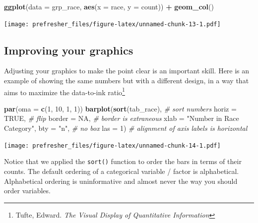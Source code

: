 \documentclass[]{book}
\newenvironment{Shaded}{\begin{snugshade}}{\end{snugshade}}
\newcommand{\KeywordTok}[1]{\textcolor[rgb]{0.13,0.29,0.53}{\textbf{#1}}}
\newcommand{\DataTypeTok}[1]{\textcolor[rgb]{0.13,0.29,0.53}{#1}}
\newcommand{\DecValTok}[1]{\textcolor[rgb]{0.00,0.00,0.81}{#1}}
\newcommand{\StringTok}[1]{\textcolor[rgb]{0.31,0.60,0.02}{#1}}
\newcommand{\CommentTok}[1]{\textcolor[rgb]{0.56,0.35,0.01}{\textit{#1}}}
\newcommand{\OtherTok}[1]{\textcolor[rgb]{0.56,0.35,0.01}{#1}}
\newcommand{\OperatorTok}[1]{\textcolor[rgb]{0.81,0.36,0.00}{\textbf{#1}}}
\newcommand{\NormalTok}[1]{#1}
\let\rmarkdownfootnote\footnote%
\def\footnote{\protect\rmarkdownfootnote}
\theoremstyle{definition}
\theoremstyle{definition}
\theoremstyle{definition}
\theoremstyle{remark}
\begin{document}
\begin{Shaded}
\begin{Highlighting}[]
\KeywordTok{ggplot}\NormalTok{(}\DataTypeTok{data =}\NormalTok{ grp_race, }\KeywordTok{aes}\NormalTok{(}\DataTypeTok{x =}\NormalTok{ race, }\DataTypeTok{y =}\NormalTok{ count)) }\OperatorTok{+}\StringTok{ }\KeywordTok{geom_col}\NormalTok{()}
\end{Highlighting}
\end{Shaded}

\texttt{[image: prefresher\_files/figure-latex/unnamed-chunk-13-1.pdf]}

\subsection{Improving your graphics}\label{improving-your-graphics}

Adjusting your graphics to make the point clear is an important skill.
Here is an example of showing the same numbers but with a different
design, in a way that aims to maximize the data-to-ink ratio\footnote{Tufte,
  Edward. \emph{The Visual Display of Quantitative Information}}

\begin{Shaded}
\begin{Highlighting}[]
\KeywordTok{par}\NormalTok{(}\DataTypeTok{oma =} \KeywordTok{c}\NormalTok{(}\DecValTok{1}\NormalTok{, }\DecValTok{10}\NormalTok{, }\DecValTok{1}\NormalTok{, }\DecValTok{1}\NormalTok{))}
\KeywordTok{barplot}\NormalTok{(}\KeywordTok{sort}\NormalTok{(tab_race), }\CommentTok{# sort numbers}
        \DataTypeTok{horiz =} \OtherTok{TRUE}\NormalTok{, }\CommentTok{# flip}
        \DataTypeTok{border =} \OtherTok{NA}\NormalTok{, }\CommentTok{# border is extraneous}
        \DataTypeTok{xlab =} \StringTok{"Number in Race Category"}\NormalTok{, }
        \DataTypeTok{bty =} \StringTok{"n"}\NormalTok{, }\CommentTok{# no box}
        \DataTypeTok{las =} \DecValTok{1}\NormalTok{) }\CommentTok{# alignment of axis labels is horizontal}
\end{Highlighting}
\end{Shaded}

\texttt{[image: prefresher\_files/figure-latex/unnamed-chunk-14-1.pdf]}

Notice that we applied the \texttt{sort()} function to order the bars in
terms of their counts. The default ordering of a categorical variable /
factor is alphabetical. Alphabetical ordering is uninformative and
almost never the way you should order variables.
\end{document}
